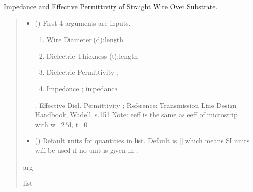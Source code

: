 \documentclass[letterpaper,10pt,english]{sphinxmanual}
\begin{document}

\begin{fulllineitems}
\label{\detokenize{components:components.Zo_eeff_WireOnGroundedSubstrate}}
\pysigstartsignatures
{}
\pysigstopsignatures
\sphinxAtStartPar
Impedance and Effective Permittivity of Straight Wire Over Substrate.
\begin{quote}\begin{description}
\begin{itemize}
\item {} 
\sphinxAtStartPar
{} () \textendash{} 
\sphinxAtStartPar
First 4 arguments are inputs.
\begin{enumerate}
%
\item {} 
\sphinxAtStartPar
Wire Diameter (d);length

\item {} 
\sphinxAtStartPar
Dielectric Thickness (t);length

\item {} 
\sphinxAtStartPar
Dielectric Permittivity ;

\item {} 
\sphinxAtStartPar
Impedance ; impedance

\end{enumerate}

.  Effective Diel. Permittivity ;
Reference:  Transmission Line Design Handbook, Wadell, s.151
Note: eeff is the same as eeff of microstrip with w=2*d, t=0


\item {} 
\sphinxAtStartPar
{} (\sphinxstyleliteralemphasis{\sphinxupquote{, }}) \textendash{} Default units for quantities in  list. Default is {[}{]} which means SI units will be used if no unit is given in .

\end{itemize}

\sphinxAtStartPar
arg

\sphinxAtStartPar
list

\end{description}\end{quote}

\end{fulllineitems}
\end{document}
